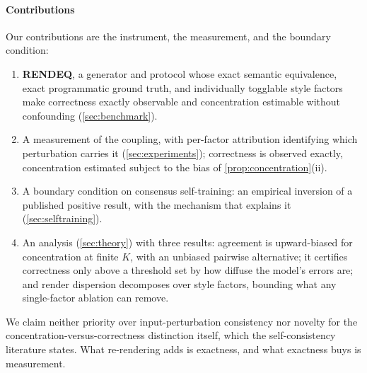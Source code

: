 \documentclass[11pt]{article}
\begin{document}
\paragraph{Contributions} Our contributions are the instrument, the measurement, and the boundary condition:
\begin{enumerate}
\item \textbf{RENDEQ}, a generator and protocol whose exact semantic equivalence, exact programmatic ground truth, and individually togglable style factors make correctness exactly observable and concentration estimable without confounding (\cref{sec:benchmark}).
\item A measurement of the coupling, with per-factor attribution identifying which perturbation carries it (\cref{sec:experiments}); correctness is observed exactly, concentration estimated subject to the bias of \cref{prop:concentration}(ii).
\item A boundary condition on consensus self-training: an empirical inversion of a published positive result, with the mechanism that explains it (\cref{sec:selftraining}).
\item An analysis (\cref{sec:theory}) with three results: agreement is upward-biased for concentration at finite $K$, with an unbiased pairwise alternative; it certifies correctness only above a threshold set by how diffuse the model's errors are; and render dispersion decomposes over style factors, bounding what any single-factor ablation can remove.
\end{enumerate}

We claim neither priority over input-perturbation consistency \citep{zhang2024vluncertainty,kaya2026efficient} nor novelty for the concentration-versus-correctness distinction itself, which the self-consistency literature states. What re-rendering adds is exactness, and what exactness buys is measurement.

\end{document}
